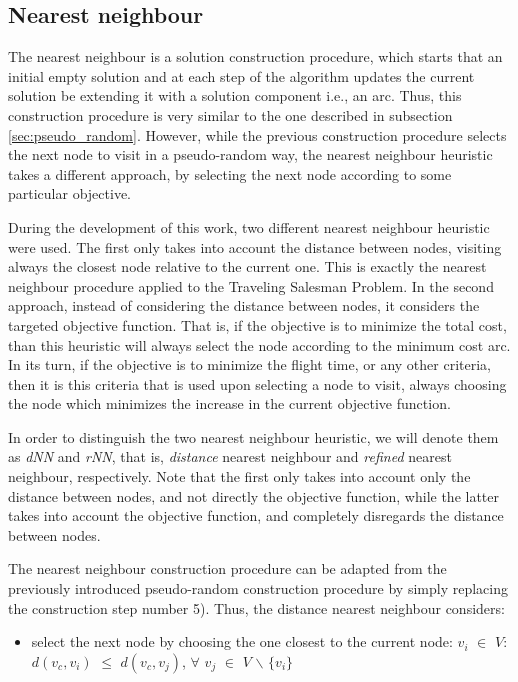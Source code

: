 \subsection{Nearest neighbour}
\label{sec:nn}

The nearest neighbour is a solution construction procedure, which starts that an initial empty solution and at each step of the algorithm updates the current solution be extending it with a solution component i.e., an arc. Thus, this construction procedure is very similar to the one described in subsection \ref{sec:pseudo_random}. However, while the previous construction procedure selects the next node to visit in a pseudo-random way, the nearest neighbour heuristic takes a different approach, by selecting the next node according to some particular objective.

During the development of this work, two different nearest neighbour heuristic were used. The first only takes into account the distance between nodes, visiting always the closest node relative to the current one. This is exactly the nearest neighbour procedure applied to the Traveling Salesman Problem. In the second approach, instead of considering the distance between nodes, it considers the targeted objective function. That is, if the objective is to minimize the total cost, than this heuristic will always select the node according to the minimum cost arc. In its turn, if the objective is to minimize the flight time, or any other criteria, then it is this criteria that is used upon selecting a node to visit, always choosing the node which minimizes the increase in the current objective function. 

In order to distinguish the two nearest neighbour heuristic, we will denote them as \textit{dNN} and \textit{rNN}, that is, \textit{distance} nearest neighbour and  \textit{refined} nearest neighbour, respectively. Note that the first only takes into account only the distance between nodes, and not directly the objective function, while the latter takes into account the objective function, and completely disregards the distance between nodes.

The nearest neighbour construction procedure can be adapted from the previously introduced pseudo-random construction procedure by simply replacing the construction step number 5). Thus, the distance nearest neighbour considers:

\begin{itemize}
    \item select the next node by choosing the one closest to the current node: \newline
    $v_i$ $\in$ $V$: $d(v_c, v_i)$ $\leq$ $d(v_c, v_j)$,
    $\forall$ $v_j$ $\in$ $V$ $\backslash$ $\{v_i\}$   
\end{itemize}

